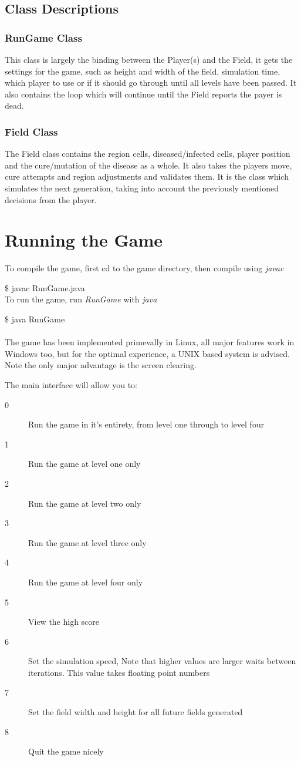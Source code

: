 \documentclass[pdftex,12pt,a4paper]{article}
\begin{document}
		\subsection{Class Descriptions}
			\subsubsection{RunGame Class}
			This class is largely the binding between the Player(s) and the Field, it gets the settings for the game, such as height and width of the field, simulation time, which player to use or if it should go through until all levels have been passed. It also contains the loop which will continue until the Field reports the payer is dead.
			\subsubsection{Field Class}
			The Field class contains the region cells, diseased/infected cells, player position and the cure/mutation of the disease as a whole. It also takes the players move, cure attempts and region adjustments and validates them. It is the class which simulates the next generation, taking into account the previously mentioned decisions from the player.
	\section{Running the Game}
		To compile the game, first cd to the game directory, then compile using \emph{javac}

		\$ javac RunGame.java
		\\To run the game, run \emph{RunGame} with \emph{java}

		\$ java RunGame\\
		\\The game has been implemented primevally in Linux, all major features work in Windows too, but for the optimal experience, a UNIX based system is advised. Note the only major advantage is the screen clearing.

		The main interface will allow you to:
		\begin{description}
			\item[0] Run the game in it's entirety, from level one through to level four
			\item[1] Run the game at level one only
			\item[2] Run the game at level two only
			\item[3] Run the game at level three only
			\item[4] Run the game at level four only
			\item[5] View the high score
			\item[6] Set the simulation speed, Note that higher values are larger waits between iterations. This value takes floating point numbers
			\item[7] Set the field width and height for all future fields generated
			\item[8] Quit the game nicely
		\end{description}
\end{document}
